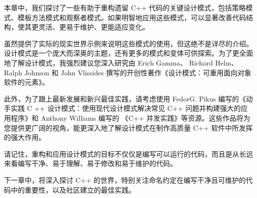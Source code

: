 本章中，我们探讨了一些有助于重构遗留 C++ 代码的关键设计模式，包括策略模式、模板方法模式和观察者模式。如果明智地应用这些模式，可以显著改善代码结构，使其更灵活、更易于维护、更能适应变化。

虽然提供了实际的现实世界示例来说明这些模式的使用，但这绝不是详尽的介绍。设计模式是一个庞大而深奥的主题，还有更多的模式和变体可供探索。为了更全面地了解设计模式，我强烈建议您深入研究由 Erich Gamma、 Richard Helm、 Ralph Johnson 和 John Vlissides 撰写的开创性著作《设计模式：可重用面向对象软件的元素》。

此外，为了跟上最新发展和新兴最佳实践，请考虑使用 FedorG. Pikus 编写的《动手实践 C ++ 设计模式：使用现代设计模式解决常见 C++ 问题并构建强大的应用程序》和 Anthony Williams 编写的 《C++ 并发实践》等资源。这些作品将为您提供更广阔的视角，能更深入地了解设计模式在制作高质量 C++ 软件中所发挥的强大作用。

请记住，重构和应用设计模式的目标不仅仅是编写可以运行的代码，而且是从长远来看编写干净、易于理解、易于修改和易于维护的代码。

下一章中，将深入探讨 C++ 的世界，特别关注命名约定在编写干净且可维护的代码中的重要性，以及社区建立的最佳实践。
